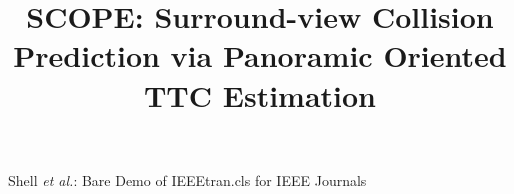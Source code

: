 \documentclass[journal]{IEEEtran}
\begin{document}
%
\title{\huge
SCOPE: Surround-view Collision Prediction via Panoramic Oriented TTC Estimation
}
%
%
%



%
{Shell \MakeLowercase{\textit{et al.}}: Bare Demo of IEEEtran.cls for IEEE Journals}
% 







\end{document}
